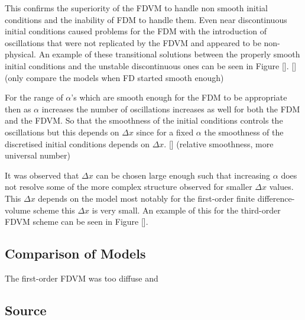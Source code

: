 \documentclass[SingleSpace,12pt,Journal]{Serre_ASCE}
\begin{document}
This confirms the superiority of the FDVM to handle non smooth initial conditions and the inability of FDM to handle them. Even near discontinuous initial conditions caused problems for the FDM with the introduction of oscillations that were not replicated by the FDVM and appeared to be non-physical. An example of these transitional solutions between the properly smooth initial conditions and the unstable discontinuous ones can be seen in Figure []. [](only compare the models when FD started smooth enough)

For the range of $\alpha$'s which are smooth enough for the FDM to be appropriate then as $\alpha$ increases the number of oscillations increases as well for both the FDM and the FDVM. So that the smoothness of the initial conditions controls the oscillations but this depends on $\Delta x$ since for a fixed $\alpha$ the smoothness of the discretised initial conditions depends on $\Delta x$. [] (relative smoothness, more universal number)

It was observed that $\Delta x$ can be chosen large enough such that increasing $\alpha$ does not resolve some of the more complex structure observed for smaller $\Delta x$ values. This $\Delta x$ depends on the model most notably for the first-order finite difference-volume scheme this $\Delta x$ is very small. An example of this for the third-order FDVM scheme can be seen in Figure []. 



\subsection{Comparison of Models}
The first-order FDVM was too diffuse and

\subsection{Source}
\end{document}

